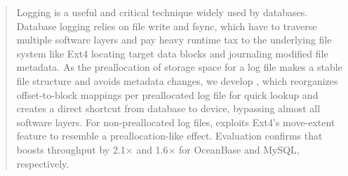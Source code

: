 \begin{abstract}
Logging is a useful and critical technique   widely used by databases.
Database logging relies on file write and fsync, which have to
traverse multiple software layers and pay %
  heavy runtime tax %
  to %
  the underlying file system like Ext4 %
  locating target data blocks and journaling modified file metadata. %
As the
  preallocation of storage space for a log file makes a stable file structure and avoids
metadata changes, we develop \odes, which reorganizes offset-to-block mappings per preallocated log file for quick lookup  and creates a direct shortcut    from database to device, bypassing almost all software layers. 
  For non-preallocated log files, \odes exploits Ext4’s move-extent feature to resemble a preallocation-like effect. Evaluation confirms
  that \odes boosts throughput by 2.1$\times$ and 1.6$\times$ for OceanBase and MySQL, respectively.
\end{abstract}

